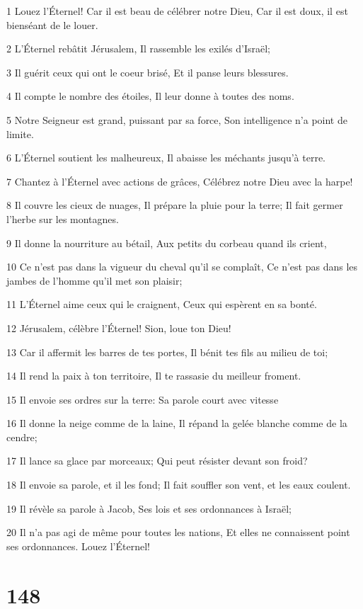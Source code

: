 \par 1 Louez l'Éternel! Car il est beau de célébrer notre Dieu, Car il est doux, il est bienséant de le louer.
\par 2 L'Éternel rebâtit Jérusalem, Il rassemble les exilés d'Israël;
\par 3 Il guérit ceux qui ont le coeur brisé, Et il panse leurs blessures.
\par 4 Il compte le nombre des étoiles, Il leur donne à toutes des noms.
\par 5 Notre Seigneur est grand, puissant par sa force, Son intelligence n'a point de limite.
\par 6 L'Éternel soutient les malheureux, Il abaisse les méchants jusqu'à terre.
\par 7 Chantez à l'Éternel avec actions de grâces, Célébrez notre Dieu avec la harpe!
\par 8 Il couvre les cieux de nuages, Il prépare la pluie pour la terre; Il fait germer l'herbe sur les montagnes.
\par 9 Il donne la nourriture au bétail, Aux petits du corbeau quand ils crient,
\par 10 Ce n'est pas dans la vigueur du cheval qu'il se complaît, Ce n'est pas dans les jambes de l'homme qu'il met son plaisir;
\par 11 L'Éternel aime ceux qui le craignent, Ceux qui espèrent en sa bonté.
\par 12 Jérusalem, célèbre l'Éternel! Sion, loue ton Dieu!
\par 13 Car il affermit les barres de tes portes, Il bénit tes fils au milieu de toi;
\par 14 Il rend la paix à ton territoire, Il te rassasie du meilleur froment.
\par 15 Il envoie ses ordres sur la terre: Sa parole court avec vitesse
\par 16 Il donne la neige comme de la laine, Il répand la gelée blanche comme de la cendre;
\par 17 Il lance sa glace par morceaux; Qui peut résister devant son froid?
\par 18 Il envoie sa parole, et il les fond; Il fait souffler son vent, et les eaux coulent.
\par 19 Il révèle sa parole à Jacob, Ses lois et ses ordonnances à Israël;
\par 20 Il n'a pas agi de même pour toutes les nations, Et elles ne connaissent point ses ordonnances. Louez l'Éternel!

\chapter{148}

